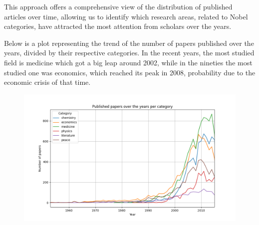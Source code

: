 \documentclass{article}
\begin{document}
\newpage

\noindent This approach offers a comprehensive view of the distribution of published articles over time, allowing us to identify which research areas, related
to Nobel categories, have attracted the most attention from scholars over the years.

\noindent Below is a plot representing the trend of the number of papers published over the years, divided by their respective categories.
In the recent years, the most studied field is medicine which got a big leap around 2002, while in the nineties the most studied one was economics, which
reached its peak in 2008, probability due to the economic crisis of that time.
\begin{figure}[ht]
	\centering
	\includegraphics[width=\textwidth]{../queries/plots/papersPerCategory.png}
\end{figure}
\end{document}
